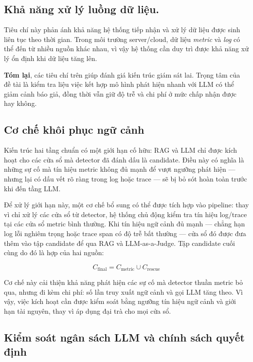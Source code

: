 \subsection*{Khả năng xử lý luồng dữ liệu.} 
Tiêu chí này phản ánh khả năng hệ thống tiếp nhận và xử lý dữ liệu được sinh liên tục theo thời gian. Trong môi trường server/cloud, dữ liệu \textit{metric} và \textit{log} có thể đến từ nhiều nguồn khác nhau, vì vậy hệ thống cần duy trì được khả năng xử lý ổn định khi dữ liệu tăng lên.

\textbf{Tóm lại}, các tiêu chí trên giúp đánh giá kiến trúc giám sát lai. Trọng tâm của đề tài là kiểm tra liệu việc kết hợp mô hình phát hiện nhanh với LLM có thể giảm cảnh báo giả, đồng thời vẫn giữ độ trễ và chi phí ở mức chấp nhận được hay không.

\subsection{Cơ chế khôi phục ngữ cảnh}

Kiến trúc hai tầng chuẩn có một giới hạn cố hữu: RAG và LLM chỉ 
được kích hoạt cho các cửa sổ mà detector đã đánh dấu là candidate. 
Điều này có nghĩa là những sự cố mà tín hiệu metric không đủ mạnh 
để vượt ngưỡng phát hiện — nhưng lại có dấu vết rõ ràng trong log 
hoặc trace — sẽ bị bỏ sót hoàn toàn trước khi đến tầng LLM.

Để xử lý giới hạn này, một cơ chế bổ sung có thể được tích hợp vào 
pipeline: thay vì chỉ xử lý các cửa sổ từ detector, hệ thống chủ động 
kiểm tra tín hiệu log/trace tại các cửa sổ metric bình thường. Khi 
tín hiệu ngữ cảnh đủ mạnh — chẳng hạn log lỗi nghiêm trọng hoặc 
trace span có độ trễ bất thường — cửa sổ đó được đưa thêm vào tập 
candidate để qua RAG và LLM-as-a-Judge. Tập candidate cuối cùng 
do đó là hợp của hai nguồn:

$$C_{\text{final}} = C_{\text{metric}} \cup C_{\text{rescue}}$$

Cơ chế này cải thiện khả năng phát hiện các sự cố mà detector thuần 
metric bỏ qua, nhưng đi kèm chi phí: số lần truy xuất ngữ cảnh và 
gọi LLM tăng theo. Vì vậy, việc kích hoạt cần được kiểm soát bằng 
ngưỡng tín hiệu ngữ cảnh và giới hạn tài nguyên, thay vì áp dụng 
đại trà cho mọi cửa sổ.

\subsection{Kiểm soát ngân sách LLM và chính sách quyết định}

